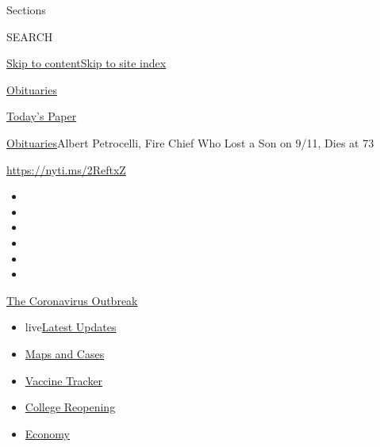 Sections

SEARCH

\protect\hyperlink{site-content}{Skip to
content}\protect\hyperlink{site-index}{Skip to site index}

\href{https://www.nytimes3xbfgragh.onion/section/obituaries}{Obituaries}

\href{https://myaccount.nytimes3xbfgragh.onion/auth/login?response_type=cookie\&client_id=vi}{}

\href{https://www.nytimes3xbfgragh.onion/section/todayspaper}{Today's
Paper}

\href{/section/obituaries}{Obituaries}\textbar{}Albert Petrocelli, Fire
Chief Who Lost a Son on 9/11, Dies at 73

\url{https://nyti.ms/2ReftxZ}

\begin{itemize}
\item
\item
\item
\item
\item
\item
\end{itemize}

\href{https://www.nytimes3xbfgragh.onion/news-event/coronavirus?action=click\&pgtype=Article\&state=default\&region=TOP_BANNER\&context=storylines_menu}{The
Coronavirus Outbreak}

\begin{itemize}
\tightlist
\item
  live\href{https://www.nytimes3xbfgragh.onion/2020/08/04/world/coronavirus-covid-19.html?action=click\&pgtype=Article\&state=default\&region=TOP_BANNER\&context=storylines_menu}{Latest
  Updates}
\item
  \href{https://www.nytimes3xbfgragh.onion/interactive/2020/us/coronavirus-us-cases.html?action=click\&pgtype=Article\&state=default\&region=TOP_BANNER\&context=storylines_menu}{Maps
  and Cases}
\item
  \href{https://www.nytimes3xbfgragh.onion/interactive/2020/science/coronavirus-vaccine-tracker.html?action=click\&pgtype=Article\&state=default\&region=TOP_BANNER\&context=storylines_menu}{Vaccine
  Tracker}
\item
  \href{https://www.nytimes3xbfgragh.onion/2020/08/02/us/covid-college-reopening.html?action=click\&pgtype=Article\&state=default\&region=TOP_BANNER\&context=storylines_menu}{College
  Reopening}
\item
  \href{https://www.nytimes3xbfgragh.onion/live/2020/08/03/business/stock-market-today-coronavirus?action=click\&pgtype=Article\&state=default\&region=TOP_BANNER\&context=storylines_menu}{Economy}
\end{itemize}

